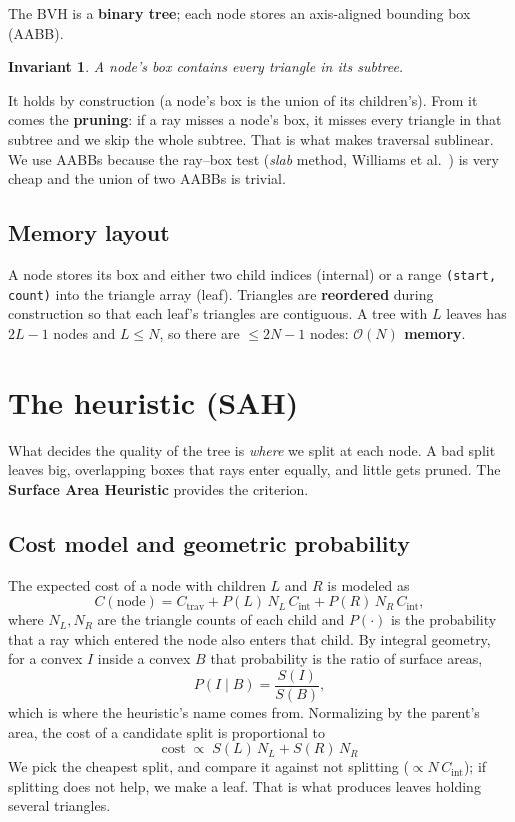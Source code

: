 \documentclass[11pt]{article}
\newtheorem{invariant}{Invariant}
\begin{document}
The BVH is a \textbf{binary tree}; each node stores an axis-aligned bounding box
(AABB).

\begin{invariant}\label{inv:bound}
A node's box contains every triangle in its subtree.
\end{invariant}

\noindent
It holds by construction (a node's box is the union of its children's). From it
comes the \textbf{pruning}: if a ray misses a node's box, it misses every triangle
in that subtree and we skip the whole subtree. That is what makes traversal
sublinear. We use AABBs because the ray--box test (\emph{slab} method, Williams et
al.~\cite{williams}) is very cheap and the union of two AABBs is trivial.

\subsection{Memory layout}

A node stores its box and either two child indices (internal) or a range
\texttt{(start, count)} into the triangle array (leaf). Triangles are
\textbf{reordered} during construction so that each leaf's triangles are
contiguous. A tree with $L$ leaves has $2L-1$ nodes and $L \le N$, so there are
$\le 2N-1$ nodes: \textbf{$\mathcal{O}(N)$ memory}.

\section{The heuristic (SAH)}

What decides the quality of the tree is \emph{where} we split at each node. A bad
split leaves big, overlapping boxes that rays enter equally, and little gets
pruned. The \textbf{Surface Area Heuristic} provides the criterion.

\subsection{Cost model and geometric probability}

The expected cost of a node with children $L$ and $R$ is modeled as
\[
C(\text{node}) = C_{\text{trav}} + P(L)\,N_L\,C_{\text{int}} + P(R)\,N_R\,C_{\text{int}},
\]
where $N_L, N_R$ are the triangle counts of each child and $P(\cdot)$ is the
probability that a ray which entered the node also enters that child. By integral
geometry, for a convex $I$ inside a convex $B$ that probability is the ratio of
surface areas,
\[
P(I \mid B) = \frac{S(I)}{S(B)},
\]
which is where the heuristic's name comes from. Normalizing by the parent's area,
the cost of a candidate split is proportional to
\[
\boxed{\;\text{cost} \;\propto\; S(L)\,N_L + S(R)\,N_R\;}
\]
We pick the cheapest split, and compare it against not splitting
($\propto N\,C_{\text{int}}$); if splitting does not help, we make a leaf. That is
what produces leaves holding several triangles.
\end{document}
